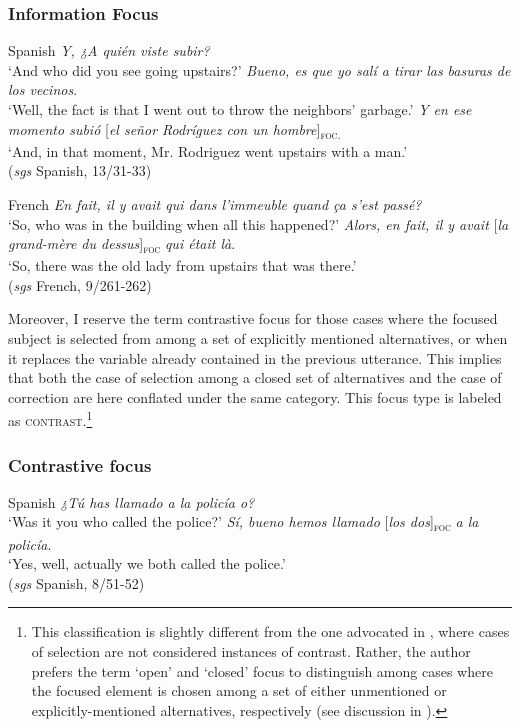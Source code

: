 \newpage
\subsubsection{Information Focus}
 \ea \label{ex:3:12} Spanish
\ea	\textit{Y, ¿A quién viste subir?} \\
 `And who did you see going upstairs?'
\textit{Bueno, es que yo salí a tirar las basuras de los vecinos}.\\
 ‘Well, the fact is that I went out to throw the neighbors' garbage.'
\ex \textit{Y en ese momento subió} {[\textit{el señor Rodríguez con un hombre}}]\textsubscript{\textsc{foc.}}\normalsize \\
‘And, in that moment, Mr. Rodriguez went upstairs with a man.' \\
\hfill (\textit{sgs} Spanish, 13/31-33)
\z
\z

 \ea \label{ex:3:13} French
\ea	\textit{En fait, il y avait qui dans l'immeuble quand ça s'est passé?}\\
 ‘So, who was in the building when all this happened?'
\ex \textit{Alors, en fait, il y avait} {[\textit{la grand-mère du dessus}]\textsubscript{\textsc{foc}}} \normalsize \textit{qui était là}.  \\
‘So, there was the old lady from upstairs that was there.' \\
\hfill (\textit{sgs} French, 9/261-262)    
\z \z


Moreover, I reserve the term contrastive focus for those cases where the focused subject is selected from among a set of explicitly mentioned alternatives, or when it replaces the variable already contained in the previous utterance. This implies that both the case of selection among a closed set of alternatives \parencite{chafe1976givenness} and the case of correction \parencite{van2004incompatibility, steube2001correction, gussenhoven2008types, REPP20101333, riester2013focus, lahousse2014distribution} are here conflated under the same category. This focus type is labeled as \textsc{contrast}.\footnote{This classification is slightly different from the one advocated in \textcite{krifka2008basic}, where cases of selection are not considered instances of contrast. Rather, the author prefers the term `open' and `closed' focus to distinguish among cases where the focused element is chosen among a set of either unmentioned or explicitly-mentioned alternatives, respectively (see discussion in ).}


\subsubsection{Contrastive focus}
 \ea \label{ex:3:14} Spanish
\ea \textit{	¿Tú has llamado a la policía  o?}\\
 ‘Was it you who called the police?'
\ex \textit{ Sí, bueno hemos llamado} {[\textit{los dos}]\textsubscript{\textsc{foc}}} \textit{a la policía}.\\
‘Yes, well, actually we both called the police.' \\
\hfill (\textit{sgs} Spanish, 8/51-52)   
\z \z 

